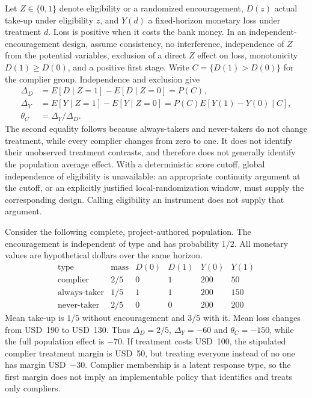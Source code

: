 Let $Z\in\{0,1\}$ denote eligibility or a randomized encouragement, $D(z)$
actual take-up under eligibility $z$, and $Y(d)$ a fixed-horizon monetary loss
under treatment $d$. Loss is positive when it costs the bank money. In an
independent-encouragement design, assume consistency, no interference,
independence of $Z$ from the potential variables, exclusion of a direct $Z$
effect on loss, monotonicity $D(1)\geq D(0)$, and a positive first stage.
Write $C=\{D(1)>D(0)\}$ for the complier group. Independence and exclusion give
\begin{align}
 \Delta_D&=E[D\mid Z=1]-E[D\mid Z=0]=P(C),\nonumber\\
 \Delta_Y&=E[Y\mid Z=1]-E[Y\mid Z=0]
          =P(C)E[Y(1)-Y(0)\mid C],\nonumber\\
 \theta_C&=\Delta_Y/\Delta_D.
 \label{exec22:riv-late}
\end{align}
The second equality follows because always-takers and never-takers do not change
treatment, while every complier changes from zero to one. It does not identify
their unobserved treatment contrasts, and therefore does not generally identify
the population average effect. With a deterministic score cutoff, global
independence of eligibility is unavailable: an appropriate continuity argument
at the cutoff, or an explicitly justified local-randomization window, must supply
the corresponding design. Calling eligibility an instrument does not supply that
argument.

Consider the following complete, project-authored population. The encouragement
is independent of type and has probability $1/2$. All monetary values are
hypothetical dollars over the same horizon.~\citep{exec22_riv_reference}
\begin{equation}
\begin{array}{c|c|cc|rr}
 \text{type}&\text{mass}&D(0)&D(1)&Y(0)&Y(1)\\\hline
 \text{complier}&2/5&0&1&200&50\\
 \text{always-taker}&1/5&1&1&200&150\\
 \text{never-taker}&2/5&0&0&200&200
\end{array}
\label{exec22:riv-population}
\end{equation}
Mean take-up is $1/5$ without encouragement and $3/5$ with it. Mean loss changes
from USD~190 to USD~130. Thus $\Delta_D=2/5$, $\Delta_Y=-60$ and
$\theta_C=-150$, while the full population effect is $-70$. If treatment costs
USD~100, the stipulated complier treatment margin is USD~50, but treating everyone
instead of no one has margin USD~$-30$. Complier membership is a latent response
type, so the first margin does not imply an implementable policy that identifies
and treats only compliers.


